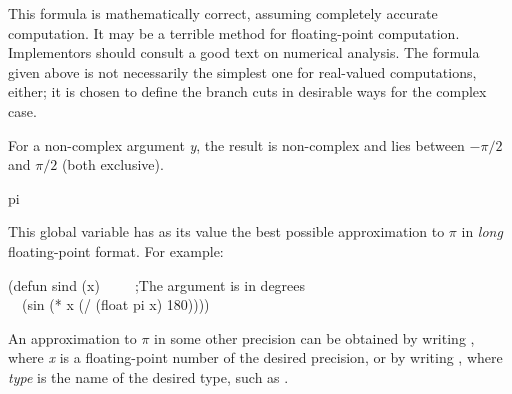 \begin{defun}[Function]
\beforenoterule
\begin{implementation}
This formula is mathematically correct, assuming
completely accurate computation.  It may be a terrible method for
floating-point computation.  Implementors should consult a good text on
numerical analysis.  The formula given above is not necessarily
the simplest one for real-valued computations, either; it is chosen
to define the branch cuts in desirable ways for the complex case.
\end{implementation}
\afternoterule

For a non-complex argument \emph{y}, the result is non-complex and lies between
$-\pi/2$ and $\pi/2$ (both exclusive).
\end{defun}

\begin{defun}[Constant]
pi

This global variable has as its value the best possible approximation to
$\pi$ in \emph{long} floating-point format.
For example:
\begin{lisp}
(defun sind (x)~~~~~;\textrm{The argument is in degrees} \\
~~(sin (* x (/ (float pi x) 180))))
\end{lisp}
An approximation to $\pi$ in some other precision can
be obtained by writing , where \emph{x} is a
floating-point number of the desired precision,
or by writing , where \emph{type} is the
name of the desired type, such as .
\end{defun}

\relax

